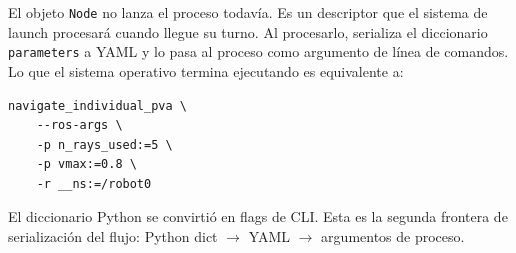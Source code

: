 El objeto \texttt{Node} no lanza el proceso todavía. Es un descriptor que el sistema de launch procesará cuando llegue su turno. Al procesarlo, serializa el diccionario \texttt{parameters} a YAML y lo pasa al proceso como argumento de línea de comandos. Lo que el sistema operativo termina ejecutando es equivalente a:

\begin{lstlisting}[style=bash, caption={Comando real que el OS ejecuta al procesar el descriptor \texttt{Node}.}]
navigate_individual_pva \
    --ros-args \
    -p n_rays_used:=5 \
    -p vmax:=0.8 \
    -r __ns:=/robot0
\end{lstlisting}

El diccionario Python se convirtió en flags de CLI. Esta es la segunda frontera de serialización del flujo: Python dict $\rightarrow$ YAML $\rightarrow$ argumentos de proceso.
